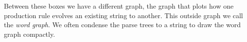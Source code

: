 Between these boxes we have a different graph, the graph that 
plots how one production rule evolves an existing string to another.
This outside graph we call the \emph{word graph}.  We often condense 
the parse trees to a string to draw the word graph compactly.
\begin{center}
\end{center}

